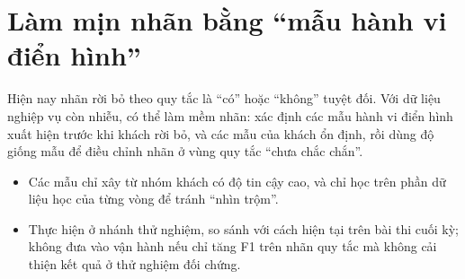 \section{Làm mịn nhãn bằng ``mẫu hành vi điển hình''}\label{sec:lamminh}

Hiện nay nhãn rời bỏ theo quy tắc là ``có'' hoặc ``không'' tuyệt đối. Với dữ liệu nghiệp vụ còn nhiễu, có thể làm mềm nhãn: xác định các mẫu hành vi điển hình xuất hiện trước khi khách rời bỏ, và các mẫu của khách ổn định, rồi dùng độ giống mẫu để điều chỉnh nhãn ở vùng quy tắc ``chưa chắc chắn''.

\begin{itemize}
  \item Các mẫu chỉ xây từ nhóm khách có độ tin cậy cao, và chỉ học trên phần dữ liệu học của từng vòng để tránh ``nhìn trộm''.
  \item Thực hiện ở nhánh thử nghiệm, so sánh với cách hiện tại trên bài thi cuối kỳ; không đưa vào vận hành nếu chỉ tăng F1 trên nhãn quy tắc mà không cải thiện kết quả ở thử nghiệm đối chứng.
\end{itemize}
